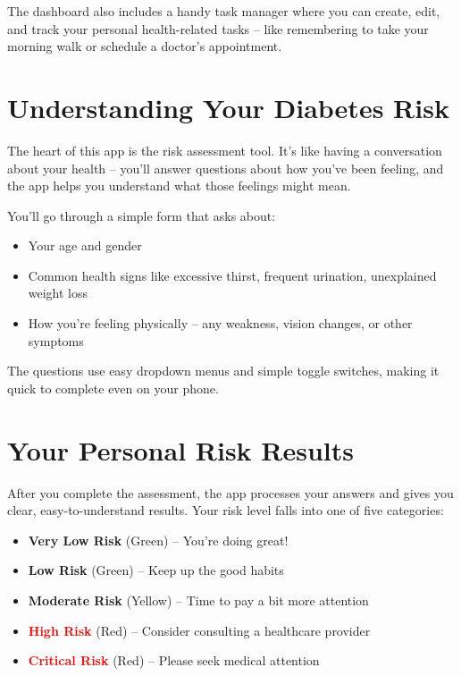 \documentclass[12pt,a4paper]{article}
\begin{document}
The dashboard also includes a handy task manager where you can create, edit, and track your personal health-related tasks -- like remembering to take your morning walk or schedule a doctor's appointment.

\section{Understanding Your Diabetes Risk}

The heart of this app is the risk assessment tool. It's like having a conversation about your health -- you'll answer questions about how you've been feeling, and the app helps you understand what those feelings might mean.

You'll go through a simple form that asks about:
\begin{itemize}
    \item Your age and gender
    \item Common health signs like excessive thirst, frequent urination, unexplained weight loss
    \item How you're feeling physically -- any weakness, vision changes, or other symptoms
\end{itemize}

The questions use easy dropdown menus and simple toggle switches, making it quick to complete even on your phone.

\section{Your Personal Risk Results}

After you complete the assessment, the app processes your answers and gives you clear, easy-to-understand results. Your risk level falls into one of five categories:

\begin{itemize}
    \item \textbf{\textcolor{green!60!black}{Very Low Risk}} (Green) -- You're doing great!
    \item \textbf{\textcolor{green!60!black}{Low Risk}} (Green) -- Keep up the good habits
    \item \textbf{\textcolor{yellow!80!black}{Moderate Risk}} (Yellow) -- Time to pay a bit more attention
    \item \textbf{\textcolor{red}{High Risk}} (Red) -- Consider consulting a healthcare provider
    \item \textbf{\textcolor{red}{Critical Risk}} (Red) -- Please seek medical attention
\end{itemize}
\end{document}
